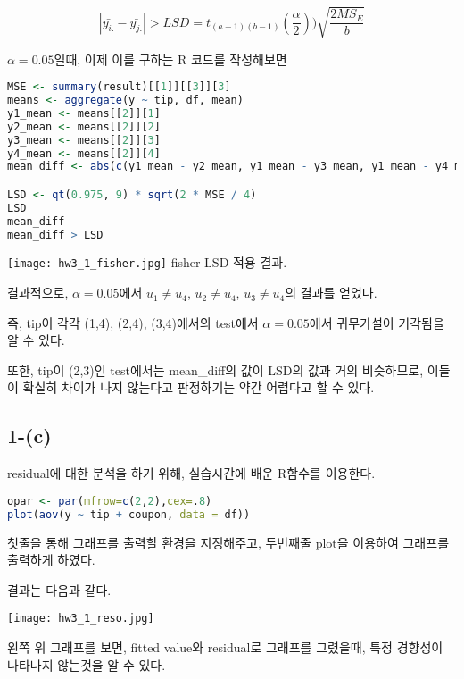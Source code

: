 \documentclass{article}
\begin{document}
$$|\bar{y_{i.}} - \bar{y_{j.}}| > LSD = t_{(a-1)(b-1)}(\frac{\alpha}{2})) \sqrt{\frac{2 MS_E}{b}}$$

$\alpha = 0.05$일때, 이제 이를 구하는 R 코드를 작성해보면


\begin{lstlisting}[language=R]
MSE <- summary(result)[[1]][[3]][3]
means <- aggregate(y ~ tip, df, mean)
y1_mean <- means[[2]][1]
y2_mean <- means[[2]][2]
y3_mean <- means[[2]][3]
y4_mean <- means[[2]][4]
mean_diff <- abs(c(y1_mean - y2_mean, y1_mean - y3_mean, y1_mean - y4_mean, y2_mean - y3_mean, y2_mean - y4_mean, y3_mean - y4_mean))

LSD <- qt(0.975, 9) * sqrt(2 * MSE / 4)
LSD
mean_diff
mean_diff > LSD
\end{lstlisting}

\begin{center}
    \texttt{[image: hw3\_1\_fisher.jpg]}
fisher LSD 적용 결과. 
\end{center} 

결과적으로, $\alpha = 0.05$에서 $u_1 \neq u_4$, $u_2 \neq u_4$, $u_3 \neq u_4$의 결과를 얻었다.

즉, tip이 각각 (1,4), (2,4), (3,4)에서의 test에서 $\alpha = 0.05$에서 귀무가설이 기각됨을 알 수 있다.

또한, tip이 (2,3)인 test에서는 mean\_diff의 값이 LSD의 값과 거의 비슷하므로, 이들이 확실히 차이가 나지 않는다고 판정하기는 약간 어렵다고 할 수 있다.


\subsection{1-(c)}

residual에 대한 분석을 하기 위해, 실습시간에 배운 R함수를 이용한다.

\begin{lstlisting}[language=R]
opar <- par(mfrow=c(2,2),cex=.8)
plot(aov(y ~ tip + coupon, data = df))
\end{lstlisting}

첫줄을 통해 그래프를 출력할 환경을 지정해주고,
두번째줄 plot을 이용하여 그래프를 출력하게 하였다.

결과는 다음과 같다.

\begin{center}
    \texttt{[image: hw3\_1\_reso.jpg]}
\end{center} 

왼쪽 위 그래프를 보면, fitted value와 residual로 그래프를 그렸을때, 특정 경향성이 나타나지 않는것을 알 수 있다. 
\end{document}
